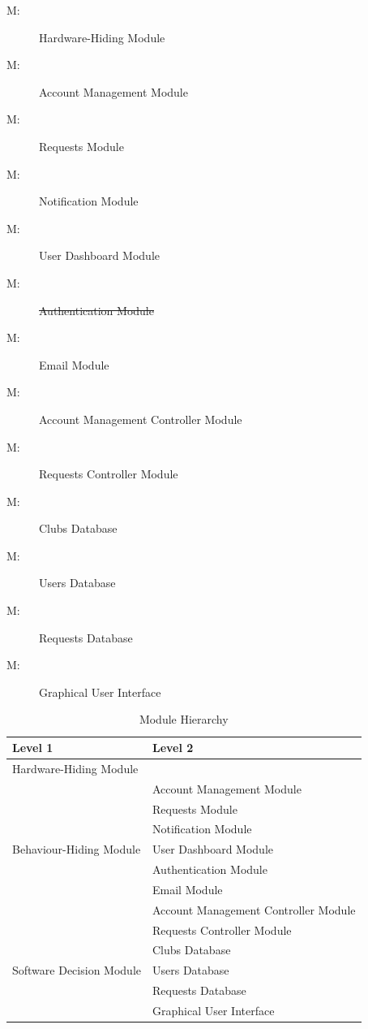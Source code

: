 \documentclass[12pt, titlepage]{article}
\newcounter{mnum}
\newcommand{\mthemnum}{M\themnum}
\begin{document}
\begin{description}
\item [ \mthemnum \label{mHH}:] Hardware-Hiding Module
\item [ \mthemnum \label{mBH1}:] Account Management Module
\item [ \mthemnum \label{mBH2}:] Requests Module
\item [ \mthemnum \label{mBH3}:] Notification Module
\item [ \mthemnum \label{mBH4}:] User Dashboard Module
\item [ \mthemnum \label{mBH5}:] \st{Authentication Module}
\item [ \mthemnum \label{mBH6}:] Email Module
\item [ \mthemnum \label{mBH7}:] Account Management Controller Module
\item [ \mthemnum \label{mBH8}:] Requests Controller Module
\item [ \mthemnum \label{mSD1}:] Clubs Database
\item [ \mthemnum \label{mSD2}:] Users Database
\item [ \mthemnum \label{mSD3}:] Requests Database
\item [ \mthemnum \label{mSD4}:] Graphical User Interface
\end{description}


\begin{table}[h!]
\centering
\begin{tabular}{p{} p{}}
\toprule
\textbf{Level 1} & \textbf{Level 2}\\
\midrule

{Hardware-Hiding Module} & ~ \\
\midrule

\multirow{7}{0.3\textwidth}{Behaviour-Hiding Module} 
& Account Management Module\\
& Requests Module\\
& Notification Module\\
& User Dashboard Module\\
& Authentication Module\\
& Email Module\\
& Account Management Controller Module\\
& Requests Controller Module\\
\midrule

\multirow{3}{0.3\textwidth}{Software Decision Module} 
& Clubs Database\\
& Users Database\\
& Requests Database\\
& Graphical User Interface\\
\bottomrule

\end{tabular}
\caption{Module Hierarchy}
\label{TblMH}
\end{table}
\end{document}
